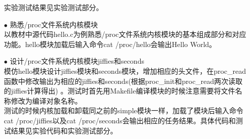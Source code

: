 \documentclass{article}
\begin{document}
\begin{itemize}
实验测试结果见实验测试部分。
\item[$\bullet$]熟悉/proc文件系统内核模块\\
以教材中源代码hello.c为例熟悉/proc文件系统内核模块的基本组成部分和对应功能。hello模块加载后输入命令cat /proc/hello会输出Hello World。
\item[$\bullet$]设计/proc文件系统内核模块jiffies和seconds\\
模仿hello模块设计jiffies模块和seconds模块，增加相应的头文件，在proc\_read函数中修改输出为相应的jiffies和seconds(根据proc\_init和proc\_read两次读取的jiffies计算得出) 。测试时首先用Makefile编译模块的时候注意需要将文件名称修改为编译对象名称。\\
测试的时候内核加载和卸载同之前的simple模块一样，加载了模块后输入命令cat /proc/jiffies以及cat /proc/seconds会输出相应的任务结果。具体代码和测试结果见实验代码和实验测试部分。
\end{itemize}
\end{document}
